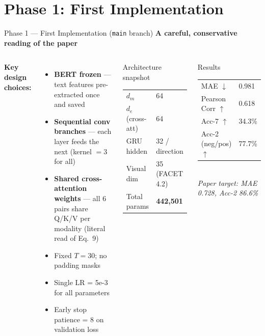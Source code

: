 \documentclass[aspectratio=169]{beamer}
\begin{document}
\section{Phase 1: First Implementation}

\begin{frame}{Phase 1 — First Implementation (\texttt{main} branch)}
  \vspace{-4pt}
  \small\textbf{A careful, conservative reading of the paper}

  \smallskip

  \begin{columns}[T]
      \small\textbf{Key design choices:}
      \begin{itemize}\setlength{\itemsep}{1pt}
        \item \textbf{BERT frozen} — text features pre-extracted once and saved
        \item \textbf{Sequential conv branches} — each layer feeds the next
          (kernel $= 3$ for all)
        \item \textbf{Shared cross-attention weights} — all 6 pairs share
          Q/K/V per modality (literal read of Eq.\ 9)
        \item Fixed $T = 30$; no padding masks
        \item Single LR = 5e-3 for all parameters
        \item Early stop patience = 8 on validation loss
      \end{itemize}

      \begin{block}{Architecture snapshot}
        \small
        \begin{tabular}{ll}
          $d_m$          & 64  \\
          $d_e$ (cross-att) & 64 \\
          GRU hidden     & 32 / direction \\
          Visual dim     & 35 (FACET 4.2) \\
          Total params   & \textbf{442,501} \\
        \end{tabular}
      \end{block}

      \vspace{4pt}
      \begin{alertblock}{Results}
        \small
        \begin{tabular}{ll}
          MAE $\downarrow$    & 0.981 \\
          Pearson Corr $\uparrow$ & 0.618 \\
          Acc-7 $\uparrow$   & 34.3\% \\
          Acc-2 (neg/pos) $\uparrow$ & 77.7\% \\
        \end{tabular}\\[2pt]
        \textit{Paper target: MAE 0.728, Acc-2 86.6\%}
      \end{alertblock}


\end{columns}
\end{frame}
\end{document}
